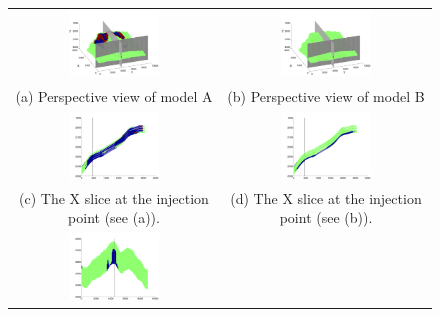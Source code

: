 \begin{figure}
\begin{tabular}{cc}
\includegraphics[width=0.45\textwidth]{./figurer/C02222_FlowSign_pers}&
\includegraphics[width=0.45\textwidth]{./figurer/C03211_FlowSign_pers}
\\(a) Perspective view of model A&(b) Perspective view of model B\\
\includegraphics[width=0.45\textwidth]{./figurer/C02222_FlowSign_slcx}&
\includegraphics[width=0.45\textwidth]{./figurer/C03211_FlowSign_slcx}
\\(c) The X slice at the injection point (see (a)).&
(d) The X slice at the injection point (see (b)).\\
\includegraphics[width=0.45\textwidth]{./figurer/C02222_FlowSign_slcy}&

\end{tabular}
\end{figure}

